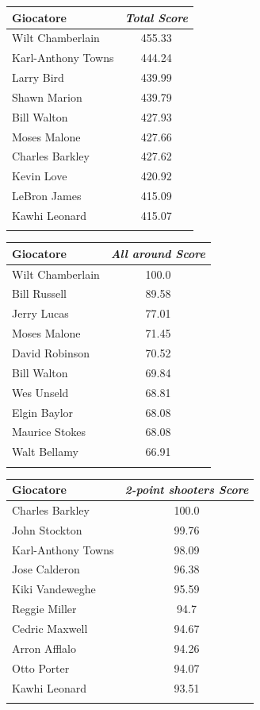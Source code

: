 \documentclass[10pt,a4paper,twocolumn]{article}
\begin{document}
\begin{table}[t]
{\begin{tabular}{lc}
		\end{tabular}
	}
	\quad
	\hspace{19pt}
	\parbox{.45\linewidth}{
		\begin{tabular}{lc}
			Giocatore & \textit{Total Score}  \\
			\hline
			Wilt Chamberlain & 455.33\\
			Karl-Anthony Towns & 444.24\\
			Larry Bird & 439.99\\
			Shawn Marion & 439.79\\
			Bill Walton & 427.93\\
			Moses Malone & 427.66\\
			Charles Barkley & 427.62\\
			Kevin Love & 420.92\\
			LeBron James & 415.09\\
			Kawhi Leonard & 415.07\\
			&\\
			
	\end{tabular}}
	
	\parbox{.45\linewidth}{
		\begin{tabular}{lc}
			Giocatore & \textit{All around Score}  \\
			\hline
			Wilt Chamberlain & 100.0\\
			Bill Russell & 89.58\\
			Jerry Lucas & 77.01\\
			Moses Malone & 71.45\\
			David Robinson & 70.52\\
			Bill Walton & 69.84\\
			Wes Unseld & 68.81\\
			Elgin Baylor & 68.08\\
			Maurice Stokes & 68.08\\
			Walt Bellamy & 66.91\\
			&\\
			
		\end{tabular}
	}
	\quad
	\hspace{19pt}
	\parbox{.45\linewidth}{
		\begin{tabular}{lc}
			Giocatore & \textit{2-point shooters Score}  \\
			\hline
			Charles Barkley & 100.0\\
			John Stockton & 99.76\\
			Karl-Anthony Towns & 98.09\\
			Jose Calderon & 96.38\\
			Kiki Vandeweghe & 95.59\\
			Reggie Miller & 94.7\\
			Cedric Maxwell & 94.67\\
			Arron Afflalo & 94.26\\
			Otto Porter & 94.07\\
			Kawhi Leonard & 93.51\\
			&\\
			

\end{tabular}}
\end{table}
\end{document}

